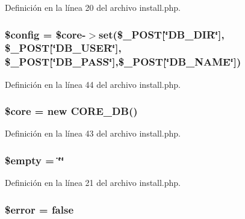 Definición en la línea 20 del archivo install.\-php.

\hypertarget{install_8php_a49c7011be9c979d9174c52a8b83e5d8e}{
\subsubsection[{\$config}]{\setlength{\rightskip}{0pt plus 5cm}\${\bf config} = \$core-\/$>$set(\$\-\_\-\-P\-O\-S\-T\mbox{[}\char`\"{}D\-B\-\_\-\-D\-I\-R\char`\"{}\mbox{]}, \$\-\_\-\-P\-O\-S\-T\mbox{[}\char`\"{}D\-B\-\_\-\-U\-S\-E\-R\char`\"{}\mbox{]}, \$\-\_\-\-P\-O\-S\-T\mbox{[}\char`\"{}D\-B\-\_\-\-P\-A\-S\-S\char`\"{}\mbox{]},\$\-\_\-\-P\-O\-S\-T\mbox{[}\char`\"{}D\-B\-\_\-\-N\-A\-M\-E\char`\"{}\mbox{]})}}\label{install_8php_a49c7011be9c979d9174c52a8b83e5d8e}


Definición en la línea 44 del archivo install.\-php.

\hypertarget{install_8php_aa432de3bacb7ced3632fa0ee0269ada3}{
\subsubsection[{\$core}]{\setlength{\rightskip}{0pt plus 5cm}\$core = new {\bf C\-O\-R\-E\-\_\-\-D\-B}()}}\label{install_8php_aa432de3bacb7ced3632fa0ee0269ada3}


Definición en la línea 43 del archivo install.\-php.

\hypertarget{install_8php_a93eb7b714bc974fda90f7c51cff07173}{
\subsubsection[{\$empty}]{\setlength{\rightskip}{0pt plus 5cm}\$empty = \char`\"{}\char`\"{}}}\label{install_8php_a93eb7b714bc974fda90f7c51cff07173}


Definición en la línea 21 del archivo install.\-php.

\hypertarget{install_8php_aeba2ab722cedda53dbb7ec1a59f45550}{
\subsubsection[{\$error}]{\setlength{\rightskip}{0pt plus 5cm}\${\bf error} = false}}\label{install_8php_aeba2ab722cedda53dbb7ec1a59f45550}


